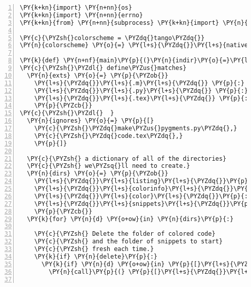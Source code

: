 \begin{Verbatim}[commandchars=\\\{\},numbers=left,numbersep=0.5em]
\PY{k+kn}{import} \PY{n+nn}{os}
\PY{k+kn}{import} \PY{n+nn}{errno}
\PY{k+kn}{from} \PY{n+nn}{subprocess} \PY{k+kn}{import} \PY{n}{call}

\PY{c}{\PYZsh{}colorscheme = \PYZdq{}tango\PYZdq{}}
\PY{n}{colorscheme} \PY{o}{=} \PY{l+s}{\PYZdq{}}\PY{l+s}{native}\PY{l+s}{\PYZdq{}}

\PY{k}{def} \PY{n+nf}{main}\PY{p}{(}\PY{n}{indir}\PY{o}{=}\PY{l+s}{\PYZdq{}}\PY{l+s}{.}\PY{l+s}{\PYZdq{}}\PY{p}{,} \PY{n}{full}\PY{o}{=}\PY{n+nb+bp}{True}\PY{p}{,} \PY{n}{delete}\PY{o}{=}\PY{n+nb+bp}{True}\PY{p}{)}\PY{p}{:}  
\PY{c}{\PYZsh{}\PYZdl{} define\PYZus{}matches}
  \PY{n}{exts} \PY{o}{=} \PY{p}{\PYZob{}}
    \PY{l+s}{\PYZdq{}}\PY{l+s}{.m}\PY{l+s}{\PYZdq{}} \PY{p}{:} \PY{l+s}{\PYZdq{}}\PY{l+s}{\PYZpc{}}\PY{l+s}{\PYZdl{}}\PY{l+s}{\PYZdq{}}\PY{p}{,} 
    \PY{l+s}{\PYZdq{}}\PY{l+s}{.py}\PY{l+s}{\PYZdq{}} \PY{p}{:} \PY{l+s}{\PYZdq{}}\PY{l+s}{\PYZsh{}\PYZdl{}}\PY{l+s}{\PYZdq{}}\PY{p}{,}
    \PY{l+s}{\PYZdq{}}\PY{l+s}{.tex}\PY{l+s}{\PYZdq{}} \PY{p}{:} \PY{l+s}{\PYZdq{}}\PY{l+s}{\PYZpc{}}\PY{l+s}{\PYZdl{}}\PY{l+s}{\PYZdq{}}\PY{p}{,}
    \PY{p}{\PYZcb{}}
\PY{c}{\PYZsh{}\PYZdl{}  }
  \PY{n}{ignores} \PY{o}{=} \PY{p}{[}
    \PY{c}{\PYZsh{}\PYZdq{}make\PYZus{}pygments.py\PYZdq{},}
    \PY{c}{\PYZsh{}\PYZdq{}code.tex\PYZdq{},}
    \PY{p}{]}

  \PY{c}{\PYZsh{} a dictionary of all of the directories}
  \PY{c}{\PYZsh{} we\PYZsq{}ll need to create.}
  \PY{n}{dirs} \PY{o}{=} \PY{p}{\PYZob{}}
    \PY{l+s}{\PYZdq{}}\PY{l+s}{listing}\PY{l+s}{\PYZdq{}}\PY{p}{:} \PY{l+s}{\PYZdq{}}\PY{l+s}{../tex/pieces/}\PY{l+s}{\PYZdq{}}\PY{p}{,}
    \PY{l+s}{\PYZdq{}}\PY{l+s}{colorinfo}\PY{l+s}{\PYZdq{}}\PY{p}{:} \PY{l+s}{\PYZdq{}}\PY{l+s}{../tex/}\PY{l+s}{\PYZdq{}}\PY{p}{,}
    \PY{l+s}{\PYZdq{}}\PY{l+s}{color}\PY{l+s}{\PYZdq{}}\PY{p}{:} \PY{l+s}{\PYZdq{}}\PY{l+s}{colorized/}\PY{l+s}{\PYZdq{}}\PY{p}{,}
    \PY{l+s}{\PYZdq{}}\PY{l+s}{snippets}\PY{l+s}{\PYZdq{}}\PY{p}{:} \PY{l+s}{\PYZdq{}}\PY{l+s}{snippets/}\PY{l+s}{\PYZdq{}}
    \PY{p}{\PYZcb{}}
  \PY{k}{for} \PY{n}{d} \PY{o+ow}{in} \PY{n}{dirs}\PY{p}{:}
    
    \PY{c}{\PYZsh{} Delete the folder of colored code}
    \PY{c}{\PYZsh{} and the folder of snippets to start}
    \PY{c}{\PYZsh{} fresh each time.}
    \PY{k}{if} \PY{n}{delete}\PY{p}{:}
      \PY{k}{if} \PY{n}{d} \PY{o+ow}{in} \PY{p}{[}\PY{l+s}{\PYZdq{}}\PY{l+s}{color}\PY{l+s}{\PYZdq{}}\PY{p}{,} \PY{l+s}{\PYZdq{}}\PY{l+s}{snippets}\PY{l+s}{\PYZdq{}}\PY{p}{]}\PY{p}{:}
        \PY{n}{call}\PY{p}{(} \PY{p}{[}\PY{l+s}{\PYZdq{}}\PY{l+s}{rm}\PY{l+s}{\PYZdq{}}\PY{p}{,} \PY{l+s}{\PYZdq{}}\PY{l+s}{\PYZhy{}fr}\PY{l+s}{\PYZdq{}}\PY{p}{,} \PY{n}{dirs}\PY{p}{[}\PY{n}{d}\PY{p}{]}\PY{p}{]} \PY{p}{)}
      

\end{Verbatim}
